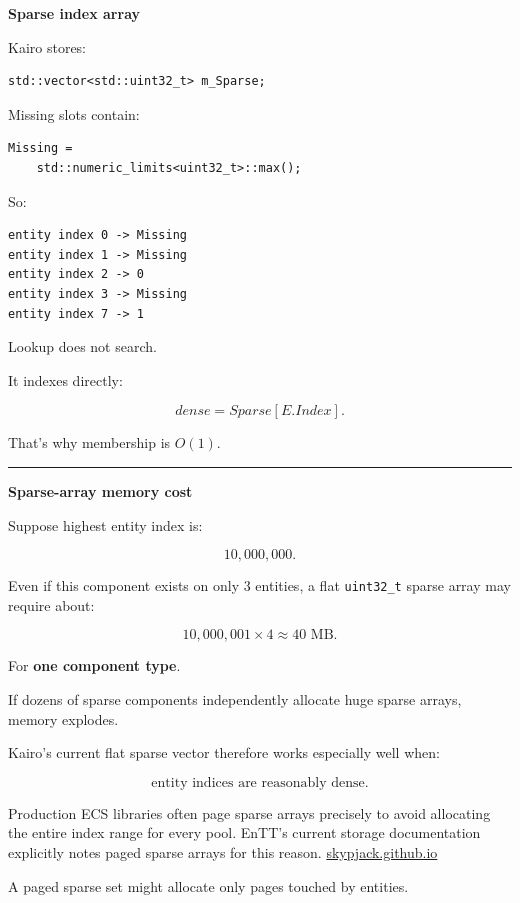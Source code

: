 \textbf{Sparse index array}

Kairo stores:

\begin{verbatim}
std::vector<std::uint32_t> m_Sparse;
\end{verbatim}

Missing slots contain:

\begin{verbatim}
Missing =
    std::numeric_limits<uint32_t>::max();
\end{verbatim}

So:

\begin{verbatim}
entity index 0 -> Missing
entity index 1 -> Missing
entity index 2 -> 0
entity index 3 -> Missing
entity index 7 -> 1
\end{verbatim}

Lookup does not search.

It indexes directly:

\[
dense=Sparse[E.Index].
\]

That's why membership is \(O(1)\).

\begin{center}\rule{0.5\linewidth}{0.5pt}\end{center}

\textbf{Sparse-array memory cost}

Suppose highest entity index is:

\[
10,000,000.
\]

Even if this component exists on only 3 entities, a flat \texttt{uint32\_t} sparse array may require about:

\[
10,000,001\times4
\approx40\text{ MB}.
\]

For \textbf{one component type}.

If dozens of sparse components independently allocate huge sparse arrays, memory explodes.

Kairo's current flat sparse vector therefore works especially well when:

\[
\text{entity indices are reasonably dense}.
\]

Production ECS libraries often page sparse arrays precisely to avoid allocating the entire index range for every pool. EnTT's current storage documentation explicitly notes paged sparse arrays for this reason. \href{https://skypjack.github.io/entt/md_docs_2md_2entity.html?utm_source=chatgpt.com}{skypjack.github.io}

A paged sparse set might allocate only pages touched by entities.

